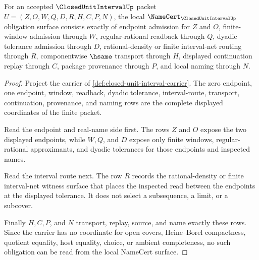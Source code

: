 \begin{theorem}
\label{thm:closed-unit-interval-namecert-obligations}
For an accepted $\ClosedUnitIntervalUp$ packet $U=(Z,O,W,Q,D,R,H,C,P,N)$, the local $\NameCert_{\ClosedUnitIntervalUp}$ obligation surface consists exactly of endpoint admission for $Z$ and $O$, finite-window admission through $W$, regular-rational readback through $Q$, dyadic tolerance admission through $D$, rational-density or finite interval-net routing through $R$, componentwise $\hsame$ transport through $H$, displayed continuation replay through $C$, package provenance through $P$, and local naming through $N$.
\end{theorem}
\begin{proof}
Project the carrier of \autoref{def:closed-unit-interval-carrier}. The zero endpoint, one endpoint, window, readback, dyadic tolerance, interval-route, transport, continuation, provenance, and naming rows are the complete displayed coordinates of the finite packet.

Read the endpoint and real-name side first. The rows $Z$ and $O$ expose the two displayed endpoints, while $W,Q$, and $D$ expose only finite windows, regular-rational approximants, and dyadic tolerances for those endpoints and inspected names.

Read the interval route next. The row $R$ records the rational-density or finite interval-net witness surface that places the inspected read between the endpoints at the displayed tolerance. It does not select a subsequence, a limit, or a subcover.

Finally $H,C,P$, and $N$ transport, replay, source, and name exactly these rows. Since the carrier has no coordinate for open covers, Heine--Borel compactness, quotient equality, host equality, choice, or ambient completeness, no such obligation can be read from the local NameCert surface.
\end{proof}

